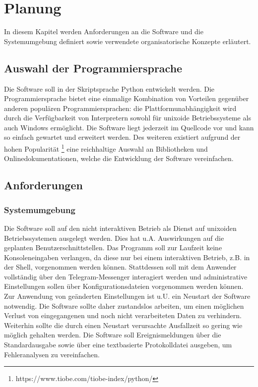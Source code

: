 \chapter{Planung}

In diesem Kapitel werden Anforderungen an die Software und die Systemumgebung definiert sowie verwendete organisatorische Konzepte erläutert.

\section{Auswahl der Programmiersprache}

Die Software soll in der Skriptsprache Python entwickelt werden. Die Programmiersprache bietet eine einmalige Kombination von Vorteilen gegenüber anderen populären Programmiersprachen: die Plattformunabhängigkeit wird durch die Verfügbarkeit von Interpretern sowohl für unixoide Betriebssysteme als auch Windows ermöglicht. Die Software liegt jederzeit im Quellcode vor und kann so einfach gewartet und erweitert werden. Des weiteren existiert aufgrund der hohen Popularität \footnote{https://www.tiobe.com/tiobe-index/python/} eine reichhaltige Auswahl an Bibliotheken und Onlinedokumentationen, welche die Entwicklung der Software vereinfachen. 

\section{Anforderungen}

\subsection{Systemumgebung}

Die Software soll auf den nicht interaktiven Betrieb als Dienst auf unixoiden Betriebssystemen ausgelegt werden. Dies hat u.A. Auswirkungen auf die geplanten Benutzerschnittstellen. Das Programm soll zur Laufzeit keine Konsoleneingaben verlangen, da diese nur bei einem interaktiven Betrieb, z.B. in der Shell, vorgenommen werden können. Stattdessen soll mit dem Anwender vollständig über den Telegram-Messenger interagiert werden und administrative Einstellungen sollen über Konfigurationsdateien vorgenommen werden können. Zur Anwendung von geänderten Einstellungen ist u.U. ein Neustart der Software notwendig. Die Software sollte daher zustandslos arbeiten, um einen möglichen Verlust von eingegangenen und noch nicht verarbeiteten Daten zu verhindern. Weiterhin sollte die durch einen Neustart verursachte Ausfallzeit so gering wie möglich gehalten werden. Die Software soll Ereignismeldungen über die Standardausgabe sowie über eine textbasierte Protokolldatei ausgeben, um Fehleranalysen zu vereinfachen.

